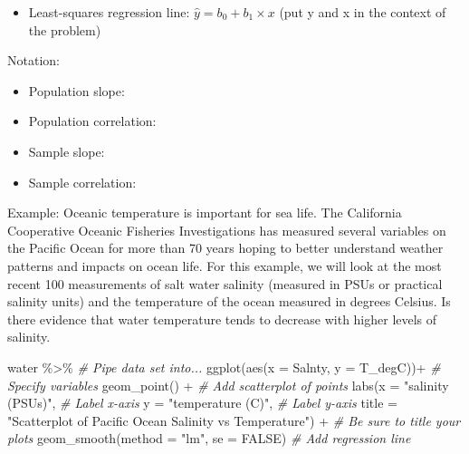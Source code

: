 \documentclass[
]{report}
\newenvironment{Shaded}{\begin{snugshade}}{\end{snugshade}}
\newcommand{\AttributeTok}[1]{\textcolor[rgb]{0.77,0.63,0.00}{#1}}
\newcommand{\CommentTok}[1]{\textcolor[rgb]{0.56,0.35,0.01}{\textit{#1}}}
\newcommand{\ConstantTok}[1]{\textcolor[rgb]{0.00,0.00,0.00}{#1}}
\newcommand{\FunctionTok}[1]{\textcolor[rgb]{0.00,0.00,0.00}{#1}}
\newcommand{\NormalTok}[1]{#1}
\newcommand{\SpecialCharTok}[1]{\textcolor[rgb]{0.00,0.00,0.00}{#1}}
\newcommand{\StringTok}[1]{\textcolor[rgb]{0.31,0.60,0.02}{#1}}
\providecommand{\tightlist}{%
  \setlength{\itemsep}{0pt}\setlength{\parskip}{0pt}}
\begin{document}

\begin{itemize}
\tightlist
\item
  Least-squares regression line: \(\hat{y}=b_0+b_1\times x\) (put y and x in the context of the problem)
\end{itemize}


Notation:

\begin{itemize}
\item
  Population slope:
\item
  Population correlation:
\item
  Sample slope:
\item
  Sample correlation:
\end{itemize}


Example: Oceanic temperature is important for sea life. The California Cooperative Oceanic Fisheries Investigations has measured several variables on the Pacific Ocean for more than 70 years hoping to better understand weather patterns and impacts on ocean life. For this example, we will look at the most recent 100 measurements of salt water salinity (measured in PSUs or practical salinity units) and the temperature of the ocean measured in degrees Celsius. Is there evidence that water temperature tends to decrease with higher levels of salinity.

\begin{Shaded}
\begin{Highlighting}[]
\NormalTok{water }\SpecialCharTok{\%\textgreater{}\%} \CommentTok{\# Pipe data set into...}
\FunctionTok{ggplot}\NormalTok{(}\FunctionTok{aes}\NormalTok{(}\AttributeTok{x =}\NormalTok{ Salnty, }\AttributeTok{y =}\NormalTok{ T\_degC))}\SpecialCharTok{+}  \CommentTok{\# Specify variables}
  \FunctionTok{geom\_point}\NormalTok{() }\SpecialCharTok{+}  \CommentTok{\# Add scatterplot of points}
  \FunctionTok{labs}\NormalTok{(}\AttributeTok{x =} \StringTok{"salinity (PSUs)"}\NormalTok{,  }\CommentTok{\# Label x{-}axis}
       \AttributeTok{y =} \StringTok{"temperature (C)"}\NormalTok{,  }\CommentTok{\# Label y{-}axis}
       \AttributeTok{title =} \StringTok{"Scatterplot of Pacific Ocean Salinity vs Temperature"}\NormalTok{) }\SpecialCharTok{+} 
               \CommentTok{\# Be sure to title your plots}
  \FunctionTok{geom\_smooth}\NormalTok{(}\AttributeTok{method =} \StringTok{"lm"}\NormalTok{, }\AttributeTok{se =} \ConstantTok{FALSE}\NormalTok{)  }\CommentTok{\# Add regression line}
\end{Highlighting}
\end{Shaded}
\end{document}
